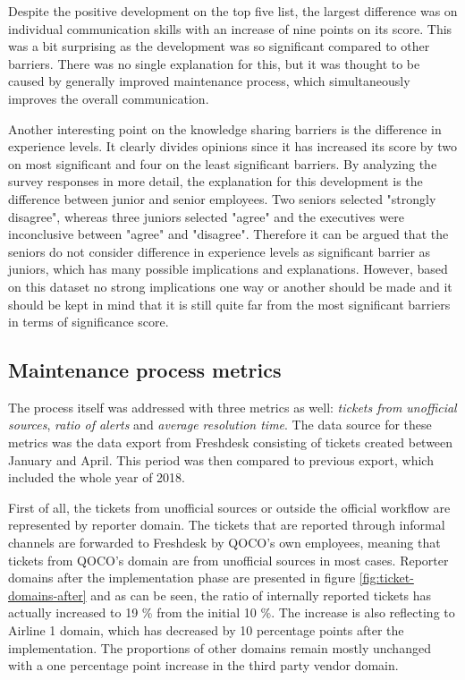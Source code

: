 Despite the positive development on the top five list, the largest difference was on individual communication skills with an increase of nine points on its score. This was a bit surprising as the development
was so significant compared to other barriers. 
There was no single explanation for this, but it was thought to be caused by generally improved maintenance process, which simultaneously improves the overall communication.

Another interesting point on the knowledge sharing barriers is the difference in experience levels. It clearly divides opinions since it has increased its score by two on most significant and four on the least
significant barriers. By analyzing the survey responses in more detail, the explanation for this development is the difference between junior and senior employees. Two seniors selected "strongly disagree",
whereas three juniors selected "agree" and the executives were inconclusive between "agree" and "disagree". Therefore it can be argued that the seniors do not consider difference in experience levels as significant
barrier as juniors, which has many possible implications and explanations. However, based on this dataset no strong implications one way or another should be made and it should be kept in mind that it
is still quite far from the most significant barriers in terms of significance score.

\subsection{Maintenance process metrics}
\label{section:process-results}

The process itself was addressed with three metrics as well: \emph{tickets from unofficial sources}, \emph{ratio of alerts} and \emph{average resolution time}. The data source for these metrics was the data
export from Freshdesk consisting of tickets created between January and April. This period was then compared to previous export, which included the whole year of 2018.

First of all, the tickets from unofficial sources
or outside the official workflow are represented by reporter domain. The tickets that are reported through informal channels are forwarded to Freshdesk by QOCO's own employees, meaning that tickets from QOCO's domain
are from unofficial sources in most cases. Reporter domains after the implementation phase are presented in figure \ref{fig:ticket-domains-after} and as can be seen, the ratio of internally reported tickets
has actually increased to 19 \% from the initial 10 \%. The increase is also reflecting to Airline 1 domain, which has decreased by 10 percentage points after the
implementation. The proportions of other domains remain mostly unchanged with a one percentage point increase in the third party vendor domain.

